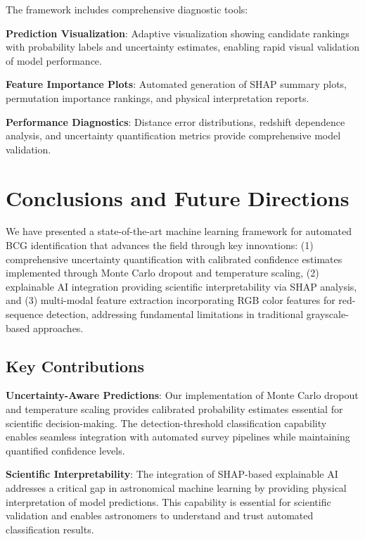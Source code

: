 \documentclass[twocolumn,10pt]{aastex631}
\begin{document}
The framework includes comprehensive diagnostic tools:

\textbf{Prediction Visualization}: Adaptive visualization showing candidate rankings with probability labels and uncertainty estimates, enabling rapid visual validation of model performance.

\textbf{Feature Importance Plots}: Automated generation of SHAP summary plots, permutation importance rankings, and physical interpretation reports.

\textbf{Performance Diagnostics}: Distance error distributions, redshift dependence analysis, and uncertainty quantification metrics provide comprehensive model validation.

\section{Conclusions and Future Directions}

We have presented a state-of-the-art machine learning framework for automated BCG identification that advances the field through key innovations: (1) comprehensive uncertainty quantification with calibrated confidence estimates implemented through Monte Carlo dropout and temperature scaling, (2) explainable AI integration providing scientific interpretability via SHAP analysis, and (3) multi-modal feature extraction incorporating RGB color features for red-sequence detection, addressing fundamental limitations in traditional grayscale-based approaches.

\subsection{Key Contributions}

\textbf{Uncertainty-Aware Predictions}: Our implementation of Monte Carlo dropout \citep{Gal2016MCDropout} and temperature scaling \citep{Laves2019WellCalibratedMU} provides calibrated probability estimates essential for scientific decision-making. The detection-threshold classification capability enables seamless integration with automated survey pipelines while maintaining quantified confidence levels.

\textbf{Scientific Interpretability}: The integration of SHAP-based explainable AI addresses a critical gap in astronomical machine learning by providing physical interpretation of model predictions. This capability is essential for scientific validation and enables astronomers to understand and trust automated classification results.
\end{document}
